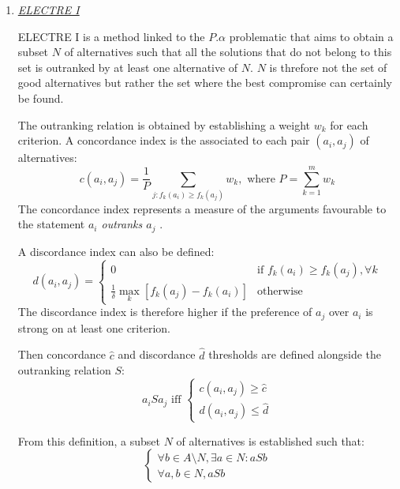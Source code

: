 \begin{enumerate}
\item \textit{\underline{ELECTRE I}}

ELECTRE I is a method linked to the $P.\alpha$ problematic that aims to obtain a subset $N$ of alternatives such that all the solutions that do not belong to this set is outranked by at least one alternative of $N$. $N$ is threfore not the set of good alternatives but rather the set where the best compromise can certainly be found.

The outranking relation is obtained by establishing a weight $w_k$ for each criterion. A concordance index is the associated to each pair $(a_i, a_j)$ of alternatives:
\begin{equation}
c(a_i, a_j) = \frac{1}{P} \sum_{j:f_{k}(a_i) \geq f_{k}(a_j)}{w_{k}}, \text{ where } P = \sum_{k=1}^{m} w_{k}
\end{equation}
The concordance index represents a measure of the arguments favourable to the statement \og \textit{$a_i$ outranks $a_j$} \fg.

A discordance index can also be defined:
\begin{equation}
d(a_i, a_j) = \begin{cases}
	0& \text{if $f_{k}(a_i) \geq f_{k}(a_j), \forall k$}\\
	\frac{1}{\delta} \max_{k} [f_{k}(a_j) - f_{k}(a_i)]& \text{otherwise}
	\end{cases}
\end{equation}
The discordance index is therefore higher if the preference of $a_j$ over $a_i$ is strong on at least one criterion.

Then concordance $\hat{c}$ and discordance $\hat{d}$ thresholds are defined alongside the outranking relation $S$:
\begin{equation}
a_iSa_j \text{ iff } \begin{cases}
	c(a_i, a_j) \geq \hat{c}\\
	d(a_i, a_j) \leq \hat{d}
	\end{cases}
\end{equation}

From this definition, a subset $N$ of alternatives is established such that:
\begin{equation}
\begin {cases}
\forall b \in A\setminus N, \exists a \in N : aSb\\
\forall a, b \in N, aSb
\end{cases}
\end{equation}


\end{enumerate}
